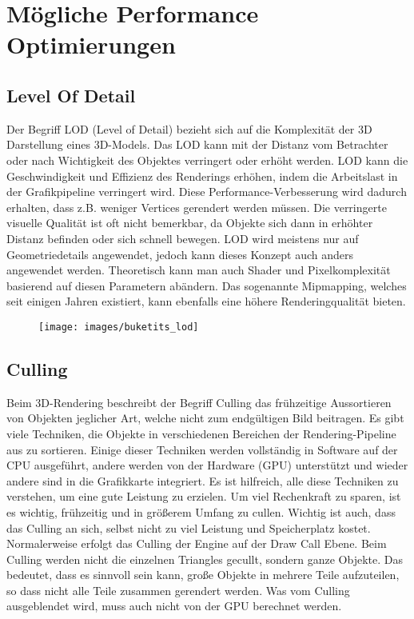 \chapter{Mögliche Performance Optimierungen}
\section{Level Of Detail}
Der Begriff LOD (Level of Detail) bezieht sich auf die Komplexität der 3D Darstellung eines 3D-Models. Das LOD kann mit der Distanz vom Betrachter oder nach Wichtigkeit des Objektes verringert oder erhöht werden. LOD kann die Geschwindigkeit und Effizienz des Renderings erhöhen, indem die Arbeitslast in der Grafikpipeline verringert wird. Diese Performance-Verbesserung wird dadurch erhalten, dass z.B. weniger Vertices gerendert werden müssen. Die verringerte visuelle Qualität ist oft nicht bemerkbar, da Objekte sich dann in erhöhter Distanz befinden oder sich schnell bewegen. LOD wird meistens nur auf Geometriedetails angewendet, jedoch kann dieses Konzept auch anders angewendet werden. Theoretisch kann man auch Shader und Pixelkomplexität basierend auf diesen Parametern abändern. Das sogenannte Mipmapping, welches seit einigen Jahren existiert, kann ebenfalls eine höhere Renderingqualität bieten.

\begin{figure}[h]
	\centering
	\texttt{[image: images/buketits\_lod]}
	\caption{\cite{_lod_formeshes}}
\end{figure}


\section{Culling}
Beim 3D-Rendering beschreibt der Begriff Culling das frühzeitige Aussortieren von Objekten jeglicher Art, welche nicht zum endgültigen Bild beitragen. Es gibt viele Techniken, die Objekte in verschiedenen Bereichen der Rendering-Pipeline aus zu sortieren. Einige dieser Techniken werden vollständig in Software auf der CPU ausgeführt, andere werden von der Hardware (GPU) unterstützt und wieder andere sind in die Grafikkarte integriert. Es ist hilfreich, alle diese Techniken zu verstehen, um eine gute Leistung zu erzielen. Um viel Rechenkraft zu sparen, ist es wichtig, frühzeitig und in größerem Umfang zu cullen. Wichtig ist auch, dass das Culling an sich, selbst nicht zu viel Leistung und Speicherplatz kostet.
Normalerweise erfolgt das Culling der Engine auf der Draw Call Ebene. Beim Culling werden nicht die einzelnen Triangles gecullt, sondern ganze Objekte. Das bedeutet, dass es sinnvoll sein kann, große Objekte in mehrere Teile aufzuteilen, so dass nicht alle Teile zusammen gerendert werden.
Was vom Culling ausgeblendet wird, muss auch nicht von der GPU berechnet werden.

